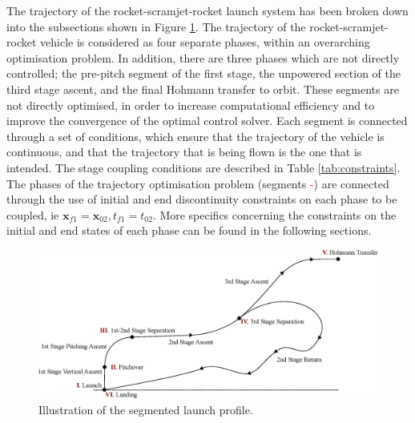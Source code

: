  The trajectory of the rocket-scramjet-rocket launch system has been broken down into the subsections shown in Figure \ref{fig:Traj}. 
 The trajectory of the rocket-scramjet-rocket vehicle is considered as four separate phases, within an overarching optimisation problem. In addition, there are three phases which are not directly controlled; the pre-pitch segment of the first stage, the unpowered section of the third stage ascent, and the final Hohmann transfer to orbit. These segments are not directly optimised, in order to increase computational efficiency and to improve the convergence of the optimal control solver. 
 Each segment is connected through a set of conditions, which ensure that the trajectory of the vehicle is continuous, and that the trajectory that is being flown is the one that is intended. 
The stage coupling conditions are described in Table \ref{tab:constraints}. 
The phases of the trajectory optimisation problem (segments \textcolor{red}{-}) are connected through the use of initial and end discontinuity constraints on each phase to be coupled, ie $\textbf{x}_{f1} = \textbf{x}_{02}, t_{f1} = t_{02}$. 
More specifics concerning the constraints on the initial and end states of each phase can be found in the following sections. 


\begin{figure}[ht]
	\centering
	\includegraphics[width=1.\linewidth]{figures/4_LODESTAR/Traj}
	\caption{Illustration of the segmented launch profile.}
	\label{fig:Traj}
\end{figure}



